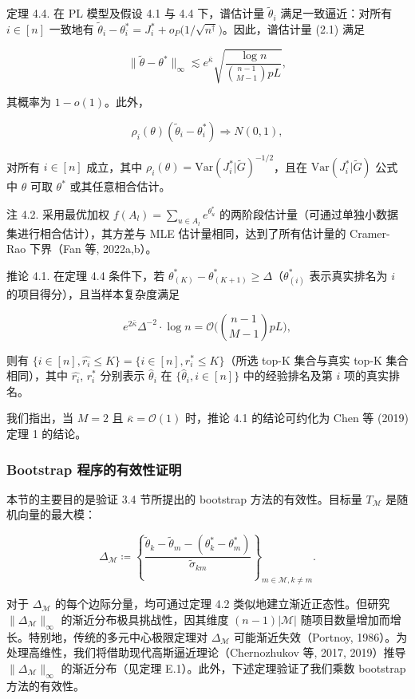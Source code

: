 定理 4.4. 在 PL 模型及假设 4.1 与 4.4 下，谱估计量 $\widetilde{\theta}_{i}$ 满足一致逼近：对所有 $i\in [n]$ 一致地有 $\widetilde{\theta}_{i} - \theta_{i}^{*} = J_{i}^{*} + o_{P}\big(1 / \sqrt{n^{\dagger}}\big)$。因此，谱估计量 (2.1) 满足

\[
\| \widetilde{\theta} -\theta^{*}\|_{\infty}\lesssim e^{\bar{\kappa}}\sqrt{\frac{\log n}{\binom{n - 1}{M - 1}pL}}, \tag{4.5}
\]

其概率为 $1 - o(1)$。此外，

$$
\rho_{i}(\theta)(\widetilde{\theta}_{i} - \theta_{i}^{*})\Rightarrow N(0,1),
$$

对所有 $i\in [n]$ 成立，其中 $\rho_{i}(\theta) = \mathrm{Var}(J_{i}^{*}|\widetilde{G})^{-1/2}$，且在 $\mathrm{Var}(J_{i}^{*}|\widetilde{G})$ 公式中 $\theta$ 可取 $\theta^{*}$ 或其任意相合估计。

注 4.2. 采用最优加权 $f(A_{l}) = \sum_{u\in A_{l}}e^{\theta_{u}^{*}}$ 的两阶段估计量（可通过单独小数据集进行相合估计），其方差与 MLE 估计量相同，达到了所有估计量的 Cramer-Rao 下界（Fan 等, 2022a,b）。

推论 4.1. 在定理 4.4 条件下，若 $\theta_{(K)}^{*} - \theta_{(K + 1)}^{*}\geq \Delta$（$\theta_{(i)}^{*}$ 表示真实排名为 $i$ 的项目得分），且当样本复杂度满足

$$
e^{2\bar{\kappa}}\Delta^{-2}\cdot \log n = \mathcal{O}\bigg(\binom{n-1}{M-1}pL\bigg),
$$

则有 $\{i\in [n],\widehat{r_{i}}\leq K\} = \{i\in [n],r_{i}^{*}\leq K\}$（所选 top-K 集合与真实 top-K 集合相同），其中 $\widehat{r_{i}}$, $r_{i}^{*}$ 分别表示 $\widehat{\theta}_{i}$ 在 $\{\widehat{\theta}_{i},i\in [n]\}$ 中的经验排名及第 $i$ 项的真实排名。

我们指出，当 $M = 2$ 且 $\bar{\kappa} = \mathcal{O}(1)$ 时，推论 4.1 的结论可约化为 Chen 等 (2019) 定理 1 的结论。


\subsubsection{Bootstrap 程序的有效性证明}

本节的主要目的是验证 3.4 节所提出的 bootstrap 方法的有效性。目标量 $T_{\mathcal{M}}$ 是随机向量的最大模： 

$$
\Delta_{\mathcal{M}}\coloneqq \left\{\frac{\widetilde{\theta}_{k} - \widetilde{\theta}_{m} - (\theta_{k}^{*} - \theta_{m}^{*})}{\widetilde{\sigma}_{km}}\right\}_{m\in \mathcal{M},k\neq m}.
$$

对于 $\Delta_{\mathcal{M}}$ 的每个边际分量，均可通过定理 4.2 类似地建立渐近正态性。但研究 $\| \Delta_{\mathcal{M}}\|_{\infty}$ 的渐近分布极具挑战性，因其维度 $(n - 1)|\mathcal{M}|$ 随项目数量增加而增长。特别地，传统的多元中心极限定理对 $\Delta_{\mathcal{M}}$ 可能渐近失效（Portnoy, 1986）。为处理高维性，我们将借助现代高斯逼近理论（Chernozhukov 等, 2017, 2019）推导 $\| \Delta_{\mathcal{M}}\|_{\infty}$ 的渐近分布（见定理 E.1）。此外，下述定理验证了我们乘数 bootstrap 方法的有效性。

